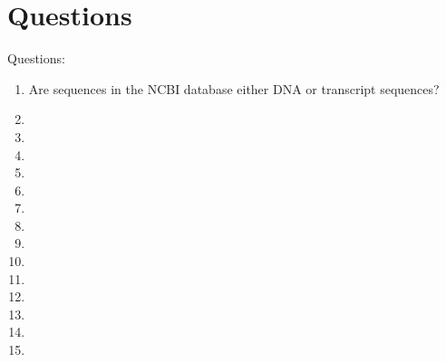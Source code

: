 \chapter{Questions}
\label{chp:Questions}



Questions: \vspace{-0.3cm}
\begin{enumerate} \itemsep -4pt
\item Are sequences in the NCBI database either DNA or transcript sequences?
\item 
\item 
\item 
\item 
\item 
\item 
\item 
\item 
\item 
\item 
\item 
\item 
\item 
\item 
\end{enumerate}














